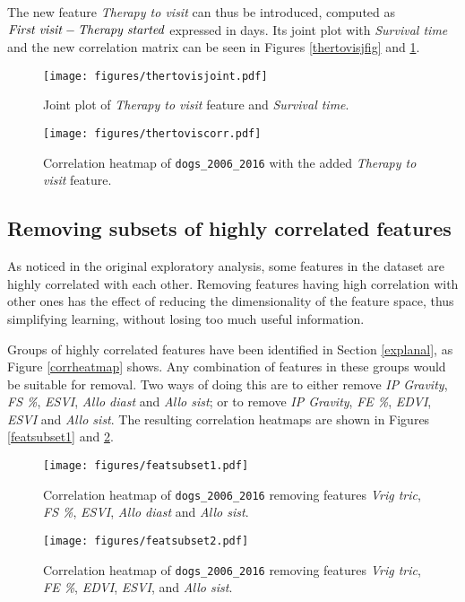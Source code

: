 \documentclass[12pt]{report}
\begin{document}
The new feature \textit{Therapy to visit} can thus be introduced, computed as $ \text{\emph{First visit}} - \text{\emph{Therapy started}} $ expressed in days. Its joint plot with \textit{Survival time} and the new correlation matrix can be seen in Figures \ref{thertovisjfig} and \ref{thertoviscfig}.

\begin{figure}[hp]
  \centering
  \vspace*{-1cm}
  	\texttt{[image: figures/thertovisjoint.pdf]}
  \caption{Joint plot of \textit{Therapy to visit} feature and \textit{Survival time}.}
  \label{thertovisjfig}
  \vspace{0.5cm}
  \centering
  	\texttt{[image: figures/thertoviscorr.pdf]}
  \vspace{-0.2cm}
  \caption{Correlation heatmap of \texttt{dogs\_2006\_2016} with the added \textit{Therapy to visit} feature.}
  \label{thertoviscfig}
\end{figure}

\subsection*{Removing subsets of highly correlated features}
As noticed in the original exploratory analysis, some features in the dataset are highly correlated with each other. Removing features having high correlation with other ones has the effect of reducing the dimensionality of the feature space, thus simplifying learning, without losing too much useful information.

Groups of highly correlated features have been identified in Section \ref{explanal}, as Figure \ref{corrheatmap} shows. Any combination of features in these groups would be suitable for removal. Two ways of doing this are to either remove \textit{IP Gravity}, \textit{FS \%}, \textit{ESVI}, \textit{Allo diast} and \textit{Allo sist}; or to remove \textit{IP Gravity}, \textit{FE \%}, \textit{EDVI}, \textit{ESVI} and \textit{Allo sist}. The resulting correlation heatmaps are shown in Figures \ref{featsubset1} and \ref{featsubset2}.

\begin{figure}[hp]
  \centering
  \vspace*{-0.8cm}
  	\texttt{[image: figures/featsubset1.pdf]}
  \vspace{-0.2cm}
  \caption{Correlation heatmap of \texttt{dogs\_2006\_2016} removing features \textit{Vrig tric}, \textit{FS \%}, \textit{ESVI}, \textit{Allo diast} and \textit{Allo sist}.}
  \label{featsubset1}
  \vspace{0.1cm}
  \centering
  	\texttt{[image: figures/featsubset2.pdf]}
  \vspace{-0.2cm}
  \caption{Correlation heatmap of \texttt{dogs\_2006\_2016} removing features \textit{Vrig tric}, \textit{FE \%}, \textit{EDVI}, \textit{ESVI}, and \textit{Allo sist}.}
  \label{featsubset2}
\end{figure}
\end{document}
